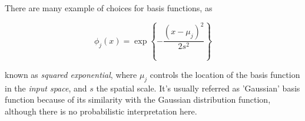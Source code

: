 \documentclass[11pt]{article} %
\begin{document}
There are many example of choices for basis functions, as

\begin{equation}
   \phi_j(x) = \exp \left\{ -\frac{\left(x-\mu_j\right)^2}{2s^2} \right\}
\end{equation}

known as \textit{squared exponential}, where $\mu_j$ controls the location of the basis function in the \textit{input space}, and $s$ the spatial scale. It's usually referred as 'Gaussian' basis function because of its similarity with the Gaussian distribution function, although there is no probabilistic interpretation here.


\lipsum[1]

\newpage


\newpage

\end{document}
